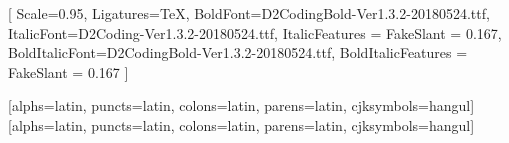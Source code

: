 \setmonofont[ExternalLocation=_extensions/bitPublish/fonts/D2Coding/]{D2Coding-Ver1.3.2-20180524.ttf}[%
  Scale=0.95,
  Ligatures=TeX,
  BoldFont=D2CodingBold-Ver1.3.2-20180524.ttf,
  ItalicFont=D2Coding-Ver1.3.2-20180524.ttf,
  ItalicFeatures = {FakeSlant = 0.167},  
  BoldItalicFont=D2CodingBold-Ver1.3.2-20180524.ttf,
  BoldItalicFeatures = {FakeSlant = 0.167}
]



%
  [alphs=latin, puncts=latin, colons=latin, parens=latin, cjksymbols=hangul]
%
  [alphs=latin, puncts=latin, colons=latin, parens=latin, cjksymbols=hangul]


\linespread{1.5}




\let\paragraph\oldparagraph
\let\subparagraph\oldsubparagraph

